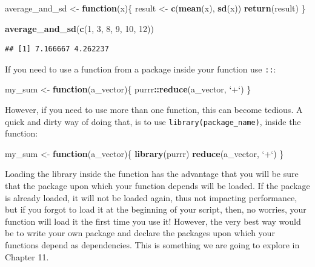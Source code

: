 \documentclass[]{gitbook}
\newenvironment{Shaded}{\begin{snugshade}}{\end{snugshade}}
\newcommand{\ControlFlowTok}[1]{\textcolor[rgb]{0.13,0.29,0.53}{\textbf{#1}}}
\newcommand{\DataTypeTok}[1]{\textcolor[rgb]{0.13,0.29,0.53}{#1}}
\newcommand{\DecValTok}[1]{\textcolor[rgb]{0.00,0.00,0.81}{#1}}
\newcommand{\KeywordTok}[1]{\textcolor[rgb]{0.13,0.29,0.53}{\textbf{#1}}}
\newcommand{\NormalTok}[1]{#1}
\newcommand{\OperatorTok}[1]{\textcolor[rgb]{0.81,0.36,0.00}{\textbf{#1}}}
\newcommand{\StringTok}[1]{\textcolor[rgb]{0.31,0.60,0.02}{#1}}
\begin{document}
\begin{Shaded}
\begin{Highlighting}[]
\NormalTok{average_and_sd <-}\StringTok{ }\ControlFlowTok{function}\NormalTok{(x)\{}
\NormalTok{  result <-}\StringTok{ }\KeywordTok{c}\NormalTok{(}\KeywordTok{mean}\NormalTok{(x), }\KeywordTok{sd}\NormalTok{(x))}
\KeywordTok{return}\NormalTok{(result)}
\NormalTok{\}}

\KeywordTok{average_and_sd}\NormalTok{(}\KeywordTok{c}\NormalTok{(}\DecValTok{1}\NormalTok{, }\DecValTok{3}\NormalTok{, }\DecValTok{8}\NormalTok{, }\DecValTok{9}\NormalTok{, }\DecValTok{10}\NormalTok{, }\DecValTok{12}\NormalTok{))}
\end{Highlighting}
\end{Shaded}

\begin{verbatim}
## [1] 7.166667 4.262237
\end{verbatim}

If you need to use a function from a package inside your function use \texttt{::}:

\begin{Shaded}
\begin{Highlighting}[]
\NormalTok{my_sum <-}\StringTok{ }\ControlFlowTok{function}\NormalTok{(a_vector)\{}
\NormalTok{  purrr}\OperatorTok{::}\KeywordTok{reduce}\NormalTok{(a_vector, }\StringTok{`}\DataTypeTok{+}\StringTok{`}\NormalTok{)}
\NormalTok{\}}
\end{Highlighting}
\end{Shaded}

However, if you need to use more than one function, this can become tedious. A quick and dirty
way of doing that, is to use \texttt{library(package\_name)}, inside the function:

\begin{Shaded}
\begin{Highlighting}[]
\NormalTok{my_sum <-}\StringTok{ }\ControlFlowTok{function}\NormalTok{(a_vector)\{}
  \KeywordTok{library}\NormalTok{(purrr)}
  \KeywordTok{reduce}\NormalTok{(a_vector, }\StringTok{`}\DataTypeTok{+}\StringTok{`}\NormalTok{)}
\NormalTok{\}}
\end{Highlighting}
\end{Shaded}

Loading the library inside the function has the advantage that you will be sure that the package
upon which your function depends will be loaded. If the package is already loaded, it will not be
loaded again, thus not impacting performance, but if you forgot to load it at the beginning of your
script, then, no worries, your function will load it the first time you use it! However, the very
best way would be to write your own package and declare the packages upon which your functions
depend as dependencies. This is something we are going to explore in Chapter 11.
\end{document}
